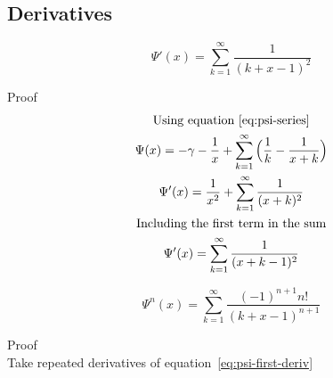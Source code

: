 \documentclass[a4paper]{article}
\begin{document}
    \subsection{Derivatives}\label{subsec:derivatives}
    \begin{theorem}
        \begin{equation}
            \label{eq:psi-first-deriv}
            \boxed{
                \Psi'(x) = \sum_{k=1}^{\infty} \frac{1}{(k+x-1)^2}
            }
        \end{equation}

        Proof
        \\
        \begin{gather*}
            \text{Using equation~\ref{eq:psi-series}}
            \\
            \Psi(x) = -\gamma - \frac{1}{x} + \sum_{k=1}^{\infty} \Big( \frac{1}{k} - \frac{1}{x+k}  \Big)
            \\
            \Psi'(x) = \frac{1}{x^2} + \sum_{k=1}^{\infty} \frac{1}{(x+k)^2}
            \\
            \text{Including the first term in the sum}
            \\
            \Psi'(x) = \sum_{k=1}^{\infty} \frac{1}{(x+k - 1)^2}
        \end{gather*}
    \end{theorem}

    \begin{theorem}
        \begin{equation}
            \label{eq:psi-nth-deriv}
            \boxed{
                \Psi^{n}(x) = \sum_{k=1}^{\infty} \frac{(-1)^{n+1} n! }{(k+x-1)^{n+1}}
            }
        \end{equation}

        Proof
        \\
        Take repeated derivatives of equation~\ref{eq:psi-first-deriv}
    \end{theorem}
\end{document}
